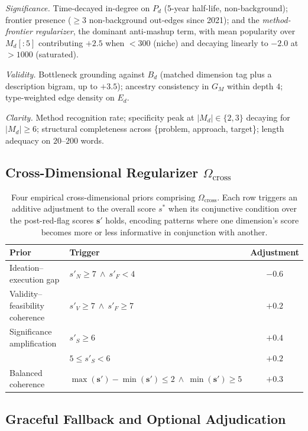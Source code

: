 \documentclass{llmxive}
\begin{document}
\emph{Significance.} Time-decayed in-degree on $P_d$ (5-year half-life, non-background); frontier presence
($\ge 3$ non-background out-edges since 2021); and the \emph{method-frontier regularizer}, the dominant
anti-mashup term, with mean popularity over $M_d[:5]$ contributing $+2.5$ when $<300$ (niche) and decaying
linearly to $-2.0$ at $>1000$ (saturated).

\emph{Validity.} Bottleneck grounding against $B_d$ (matched dimension tag plus a description bigram, up to $+3.5$); ancestry consistency in $G_M$ within depth $4$; type-weighted edge density on $E_d$.

\emph{Clarity.} Method recognition rate; specificity peak at $|M_d|\in\{2,3\}$ decaying for $|M_d|\ge 6$; structural completeness across \{problem, approach, target\}; length adequacy on $20$--$200$ words.

\subsection{Cross-Dimensional Regularizer \texorpdfstring{$\Omega_{\text{cross}}$}{cross}}
\label{app:cross-dim}

\begin{table}[!htbp]
\centering
\begin{tabularx}{\linewidth}{l X c}
\toprule
Prior & Trigger & Adjustment \\
\midrule
Ideation--execution gap & $s'_N\ge 7\ \land\ s'_F<4$ & $-0.6$ \\
Validity--feasibility coherence & $s'_V\ge 7\ \land\ s'_F\ge 7$ & $+0.2$ \\
Significance amplification & $s'_S\ge 6$ & $+0.4$ \\
& $5\le s'_S<6$ & $+0.2$ \\
Balanced coherence & $\max(\mathbf{s}')-\min(\mathbf{s}')\le 2\ \land\ \min(\mathbf{s}')\ge 5$ & $+0.3$ \\
\bottomrule
\end{tabularx}
\caption{Four empirical cross-dimensional priors comprising $\Omega_{\text{cross}}$. Each row triggers an additive
adjustment to the overall score $s^\ast$ when its conjunctive condition over the post-red-flag scores
$\mathbf{s}'$ holds, encoding patterns where one dimension's score becomes more or less informative in
conjunction with another.}
\label{tab:cross-dim}
\end{table}


\subsection{Graceful Fallback and Optional Adjudication}
\label{app:adjudication}
\end{document}
